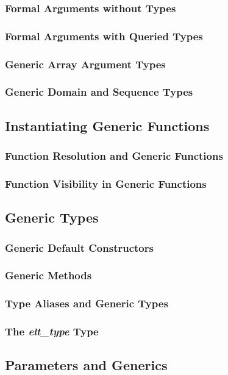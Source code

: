 \documentclass[10pt,twoside,titlepage]{article}
\begin{document}
\subsubsection{Formal Arguments without Types}
\subsubsection{Formal Arguments with Queried Types}
\subsubsection{Generic Array Argument Types}
\subsubsection{Generic Domain and Sequence Types}
\subsection{Instantiating Generic Functions}
\subsubsection{Function Resolution and Generic Functions}
\subsubsection{Function Visibility in Generic Functions}
\subsection{Generic Types}
\subsubsection{Generic Default Constructors}
\subsubsection{Generic Methods}
\subsubsection{Type Aliases and Generic Types}
\subsubsection{The {\em elt\_type} Type}
\subsection{Parameters and Generics}
\end{document}

